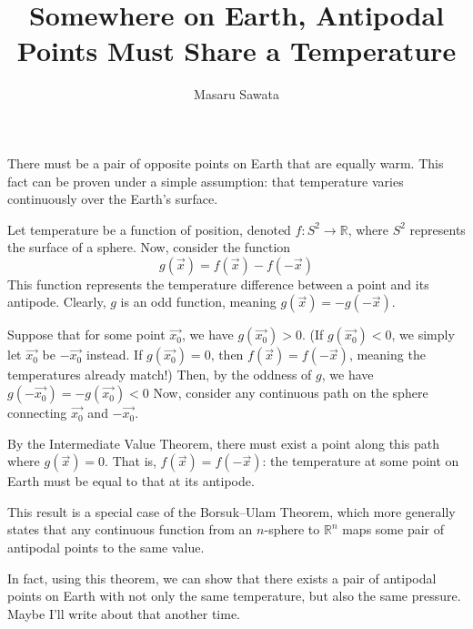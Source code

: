 \documentclass[letterpaper, 12pt]{article}
\title{Somewhere on Earth, Antipodal Points Must Share a Temperature}
\author{Masaru Sawata}
\theoremstyle{custom}
\begin{document}
\maketitle
There must be a pair of opposite points on Earth that are equally warm.
This fact can be proven under a simple assumption: that temperature varies continuously over the Earth's surface.

Let temperature be a function of position, denoted $f:S^2 \rightarrow \mathbb{R}$, where $S^2$ represents the surface of a sphere.
Now, consider the function
\begin{equation*}
  g(\vec{x}) = f(\vec{x}) - f(-\vec{x})
\end{equation*}
This function represents the temperature difference between a point and its antipode.
Clearly, $g$ is an odd function, meaning $g(\vec{x}) = -g(-\vec{x})$.

Suppose that for some point $\vec{x_0}$, we have $g(\vec{x_0}) > 0$. 
(If $g(\vec{x_0}) < 0$, we simply let $\vec{x_0}$ be $-\vec{x_0}$ instead. 
If $g(\vec{x_0}) = 0$, then $f(\vec{x}) = f(-\vec{x})$, meaning the temperatures already match!)
Then, by the oddness of $g$, we have $g(-\vec{x_0}) = -g(\vec{x_0})< 0$
Now, consider any continuous path on the sphere connecting $\vec{x_0}$ and $-\vec{x_0}$.

By the Intermediate Value Theorem, there must exist a point along this path where $g(\vec{x})=0$.
That is, $f(\vec{x}) = f(-\vec{x})$: the temperature at some point on Earth must be equal to that at its antipode.

This result is a special case of the Borsuk--Ulam Theorem, which more generally states that any continuous function from an
$n$-sphere to $\mathbb{R}^n$ maps some pair of antipodal points to the same value.

In fact, using this theorem, we can show that there exists a pair of antipodal points on Earth with not only the same temperature, but also the same pressure.
Maybe I'll write about that another time.
\end{document}
